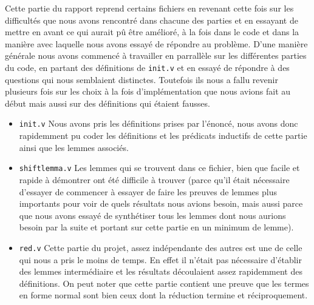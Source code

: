 Cette partie du rapport reprend certains fichiers en revenant cette fois sur les difficultés que nous avons rencontré dans chacune des parties et en essayant de mettre en avant ce qui aurait pû être amélioré, à la fois dans le code et dans la manière avec laquelle nous avons essayé de répondre au problème. D'une manière générale nous avons commencé à travailler en parrallèle sur les différentes parties du code, en partant des définitions de \texttt{init.v} et en essayé de répondre à des questions qui nous semblaient distinctes. Toutefois ils nous a fallu revenir plusieurs fois sur les choix à la fois d'implémentation que nous avions fait au début mais aussi sur des définitions qui étaient fausses.
     \begin{itemize}
      \item \texttt{init.v} Nous avons pris les définitions prises par l'énoncé, nous avons donc rapidemment pu coder les définitions et les prédicats inductifs de cette partie ainsi que les lemmes associés.
      \item \texttt{shiftlemma.v} Les lemmes qui se trouvent dans ce fichier, bien que facile et rapide à démontrer ont été difficile à trouver (parce qu'il était nécessaire d'essayer de commencer à essayer de faire les preuves de lemmes plus importants pour voir de quels résultats nous avions besoin, mais aussi parce que nous avons essayé de synthétiser tous les lemmes dont nous aurions besoin par la suite et portant sur cette partie en un minimum de lemme).
      \item \texttt{red.v} Cette partie du projet, assez indépendante des autres est une de celle qui nous a pris le moins de temps. En effet il n'était pas nécessaire d'établir des lemmes intermédiaire et les résultats découlaient assez rapidemment des définitions. On peut noter que cette partie contient une preuve que les termes en forme normal sont bien ceux dont la réduction termine et réciproquement.
     \end{itemize}